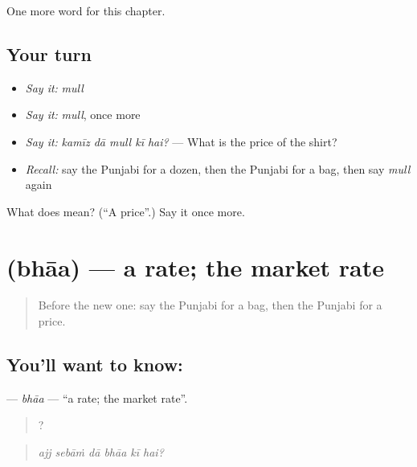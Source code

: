 \begin{grammarlens}[title={What you've built}]
One more word for this chapter.
\end{grammarlens}

\subsection*{Your turn}
\begin{itemize}
\raggedright
  \item \emph{Say it:} \emph{mull}
  \item \emph{Say it:} \emph{mull}, once more
  \item \emph{Say it:} \emph{kamīz dā mull kī hai?} — What is the price of the shirt?
  \item \emph{Recall:} say the Punjabi for a dozen, then the Punjabi for a bag, then say \emph{mull} again
\end{itemize}

\begin{tcolorbox}[breakable,colback=teal!4,colframe=teal!35!black,title={Before you move on}]
What does  mean? (\textquotedblleft{}A price\textquotedblright{}.) Say it once more.
\end{tcolorbox}
\section[\texorpdfstring{\pa{ਭਾਅ} (bhāa)}{ਭਾਅ (bhāa)}]{ (bhāa) — a rate; the market rate}

\label{lesson:PA-C276-bhaa}



\begin{quote}
Before the new one: say the Punjabi for a bag, then the Punjabi for a price.
\end{quote}

\subsection*{You'll want to know: }
\textbf{} — \emph{bhāa} — \textquotedblleft{}a rate; the market rate\textquotedblright{}.

\begin{quote}
     ?
\end{quote}

\begin{quote}
\emph{ajj sebāṁ dā bhāa kī hai?}
\end{quote}

